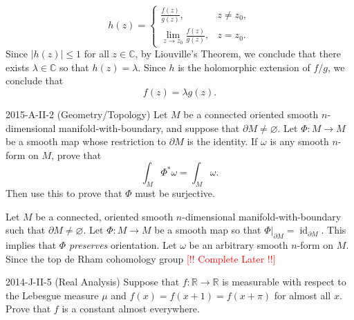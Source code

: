 \documentclass{article}
\begin{document}
\begin{solutions}
		\begin{equation}
			h(z) = 
				\begin{cases}
					\frac{f(z)}{g(z)}, & z \neq z_{0}, \\
					\lim_{z \to z_{0}}\frac{f(z)}{g(z)}, & z = z_{0}. 
				\end{cases}
		\end{equation}
	Since $|h(z)| \leq 1$ for all $z \in \mathbb{C}$, by Liouville's Theorem, we conclude that there exists $\lambda \in \mathbb{C}$ so that $h(z)= \lambda$. Since $h$ is the holomorphic extension of $f/g$, we conclude that
		\begin{equation}
			f(z) =\lambda g(z). 
		\end{equation}
\end{solutions}
\begin{prb}{2015-A-II-2 (Geometry/Topology)}
	Let $M$ be a connected oriented smooth $n$-dimensional manifold-with-boundary, and suppose that $\partial M \neq \varnothing$. Let $\Phi: M \to M$ be a smooth map whose restriction to $\partial M$ is the identity. If $\omega$ is any smooth $n$-form on $M$, prove that 
		\begin{equation*}
			\int_{M}\Phi^{\ast}\omega = \int_{M}\omega. 
		\end{equation*}
	Then use this to prove that $\Phi$ must be surjective.
\end{prb}
\begin{solutions}
	Let $M$ be a connected, oriented smooth $n$-dimensional manifold-with-boundary such that $\partial M \neq \varnothing$. Let $\Phi: M \to M$ be a smooth map so that $\Phi|_{\partial M} = \operatorname{id}_{\partial M}$. This implies that $\Phi$ \textit{preserves} orientation. Let $\omega$ be an arbitrary smooth $n$-form on $M$. Since the top de Rham cohomology group \textcolor{red}{[!! Complete Later !!]}
\end{solutions}
\begin{prb}{2014-J-II-5 (Real Analysis)}
	Suppose that $f: \mathbb{R} \to \mathbb{R}$ is measurable with respect to the Lebesgue measure $\mu$ and $f(x) = f(x + 1) = f(x + \pi)$ for almost all $x$. Prove that $f$ is a constant almost everywhere. 
\end{prb}
\end{document}
